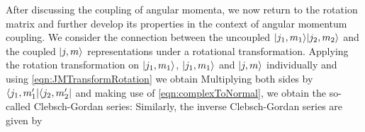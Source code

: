 After discussing the coupling of angular momenta, we now return to the rotation matrix and further develop its 
properties in the context of angular momentum coupling. We consider the connection between the uncoupled 
 $| j_1, m_1 \rangle| j_2, m_2 \rangle$ and the coupled $| j, m \rangle$ representations under a rotational transformation. 
Applying the rotation transformation on $| j_1, m_1 \rangle$, $| j_1, m_1 \rangle$ and $| j, m \rangle$ individually and using
\autoref{eqn:JMTransformRotation} we obtain
Multiplying both sides by $\langle j_1, m_1^{\prime} |\langle j_2, m_2^{\prime}  |$ and making use of \autoref{eqn:complexToNormal}, we obtain the so-called Clebsch-Gordan 
series:
Similarly, the inverse Clebsch-Gordan series are given by

